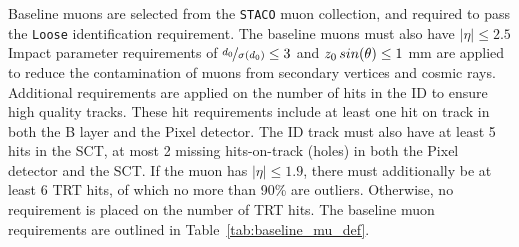 \begin{table}[ht]
\caption{Baseline electron requirements.}
\label{tab:baseline_el_def}
\end{table}

Baseline muons are selected from the \texttt{STACO} muon collection, and
required to pass the \texttt{Loose} identification requirement. The baseline
muons must also have $|\eta| \leq 2.5$ 
Impact parameter requirements of $\nicefrac{d_0}{\sigma(d_0)} \leq 3$ and
$z_0\,sin(\theta) \leq 1$ mm are applied to reduce the contamination of muons
from secondary vertices and cosmic rays.
Additional requirements are applied on the number of hits in the ID to ensure
high quality tracks.
These  hit requirements include at least one hit on track in both the B layer
and the Pixel detector.
The ID track must also have at least 5 hits in the SCT, at most 2 missing 
hits-on-track (holes) in both the Pixel detector and the SCT. 
If the muon has $|\eta| \leq 1.9$, there must additionally be at least 6 TRT
hits, of which no more than 90\% are outliers.
Otherwise, no requirement is placed on the number of TRT hits.
The baseline muon requirements are outlined in Table~\ref{tab:baseline_mu_def}.

\begin{table}[ht]
  \caption{Baseline muon requirements.}
  \label{tab:baseline_mu_def}
\end{table}

